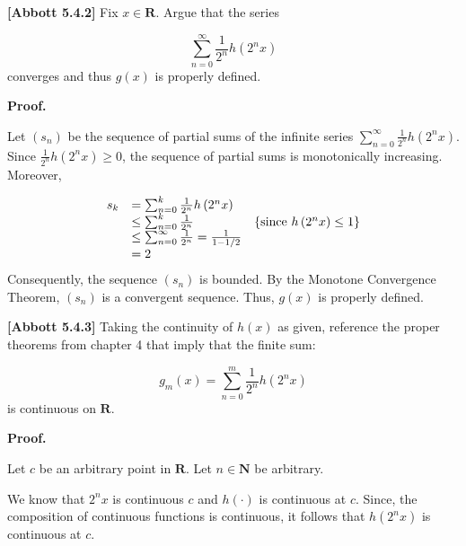 \documentclass[10pt]{article}
\begin{document}
\textbf{[Abbott 5.4.2] }Fix $\displaystyle x\in \mathbf{R}$. Argue that the series 


\begin{equation*}
\sum _{n=0}^{\infty }\frac{1}{2^{n}} h\left( 2^{n} x\right)
\end{equation*}
converges and thus $\displaystyle g( x)$ is properly defined.



\textbf{Proof.}



Let $\displaystyle ( s_{n})$ be the sequence of partial sums of the infinite series $\displaystyle \sum _{n=0}^{\infty }\frac{1}{2^{n}} h\left( 2^{n} x\right)$. Since $\displaystyle \frac{1}{2^{n}} h\left( 2^{n} x\right) \geq 0$, the sequence of partial sums is monotonically increasing. Moreover,


\begin{equation*}
\begin{array}{ c l c }
s_{k} & =\sum _{n=0}^{k}\frac{1}{2^{n}} h\left( 2^{n} x\right) & \\
 & \leq \sum _{n=0}^{k}\frac{1}{2^{n}} & \left\{\text{since } h\left( 2^{n} x\right) \leq 1\right\}\\
 & \leq \sum _{n=0}^{\infty }\frac{1}{2^{n}} =\frac{1}{1-1/2} & \\
 & =2 & 
\end{array}
\end{equation*}
 Consequently, the sequence $\displaystyle ( s_{n})$ is bounded. By the Monotone Convergence Theorem, $\displaystyle ( s_{n})$ is a convergent sequence. Thus, $\displaystyle g( x)$ is properly defined.



\textbf{[Abbott 5.4.3]} Taking the continuity of $\displaystyle h( x)$ as given, reference the proper theorems from chapter 4 that imply that the finite sum:


\begin{equation*}
g_{m}( x) =\sum _{n=0}^{m}\frac{1}{2^{n}} h\left( 2^{n} x\right)
\end{equation*}
is continuous on $\displaystyle \mathbf{R}$.



\textbf{Proof.}



Let $\displaystyle c$ be an arbitrary point in $\displaystyle \mathbf{R}$. Let $\displaystyle n\in \mathbf{N}$ be arbitrary.



We know that $\displaystyle 2^{n} x$ is continuous $\displaystyle c$ and $\displaystyle h( \cdot )$ is continuous at $\displaystyle c$. Since, the composition of continuous functions is continuous, it follows that $\displaystyle h\left( 2^{n} x\right)$ is continuous at $\displaystyle c$. 
\end{document}
